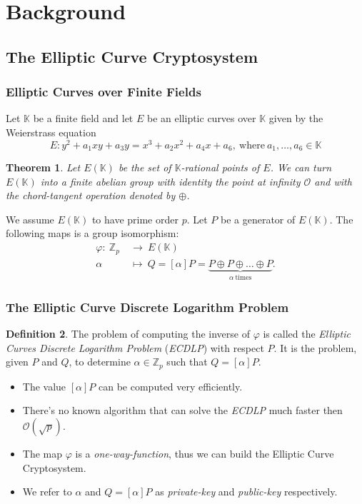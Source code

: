 \documentclass[
	11pt, %
]{beamer}
\newcommand{\Z}{\mathbb{Z}}
\newcommand{\Zp}{\mathbb{Z}_{p}}
\newcommand{\K}{\mathbb{K}}
\newcommand{\infp}{\mathcal{O}}
\newtheorem{teorema}{Theorem}[section]
\theoremstyle{definition}
\newtheorem{definizione}[teorema]{Definition}
\theoremstyle{remark}
\begin{document}

\section{Background} %
\subsection{The Elliptic Curve Cryptosystem}
\begin{frame}
	\frametitle{Elliptic Curves over Finite Fields}
	Let $\K$ be a finite field and let $E$ be an elliptic curves over $\K$ given by the Weierstrass equation
	\begin{equation*}\label{ellff}
	E:y^2+a_1xy+a_3y = x^3 + a_2x^2+a_4x + a_6,\ \text{where}\ a_1,\dots,a_6\in\K 
	\end{equation*}
\begin{teorema}
Let $E(\K)$ be the set of $\K$-rational points of $E$. We can turn $E(\K)$ into a finite abelian group with identity the point at infinity $\infp$ and with the chord-tangent operation denoted by $\oplus$.
\end{teorema}
We assume $E(\K)$ to have prime order $p$. Let $P$ be a generator of $E(\K)$. The following maps is a group isomorphism:
	\begin{align*}
		\varphi:\ \Z_p\ &\to\ E(\K)\\
		\alpha &\mapsto\ Q=[\alpha]P=\underbrace{P\oplus P\oplus\dots\oplus P}_{\alpha\ \text{times}}.
	\end{align*}
\end{frame}
\begin{frame}
\frametitle{The Elliptic Curve Discrete Logarithm Problem}
\begin{definizione}
	The problem of computing the inverse of $\varphi$ is called the \emph{Elliptic Curves Discrete Logarithm Problem} (\emph{ECDLP}) with respect $P$. It is the problem, given $P$ and $Q$, to determine $\alpha\in\Zp$ such that $Q = [\alpha]P$.
\end{definizione}
\begin{itemize}
	\item The value $[\alpha]P$ can be computed very efficiently.
	\item  There's no known algorithm that can solve the \emph{ECDLP} much faster then $\mathcal{O}(\sqrt{p})$.
	\item The map $\varphi$ is a \emph{one-way-function}, thus we can build the Elliptic Curve Cryptosystem.
	\item We refer to $\alpha$ and $Q=[\alpha]P$ as \emph{private-key} and \emph{public-key} respectively.
\end{itemize}
\end{frame}
\end{document}
